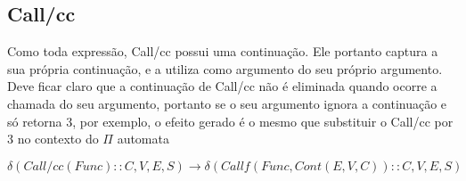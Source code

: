 


\subsection{\textbf{Call/cc}}

Como toda expressão, Call/cc possui uma continuação. Ele portanto captura a sua própria continuação, e a utiliza como argumento do seu próprio argumento. Deve ficar claro que a continuação de Call/cc não é eliminada quando ocorre a chamada do seu argumento, portanto se o seu argumento ignora a continuação e só retorna 3, por exemplo, o efeito gerado é o mesmo que substituir o Call/cc por 3 no contexto do $\Pi$ automata

$$
\delta(Call/cc(Func) :: C, V, E, S)
\rightarrow{}
\delta(Callf(Func, Cont(E,V,C)) :: C,V, E, S)
$$\label{primeira-callcc}


